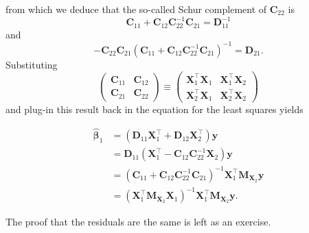 \documentclass[]{book}
\theoremstyle{definition}
\theoremstyle{definition}
\theoremstyle{definition}
\theoremstyle{remark}
\begin{document}
from which we deduce that the so-called Schur complement of
\(\mathbf{C}_{22}\) is
\[\mathbf{C}_{11}+\mathbf{C}_{12}\mathbf{C}^{-1}_{22}\mathbf{C}_{21} = \mathbf{D}_{11}^{-1}\]
and \[
-\mathbf{C}_{22}\mathbf{C}_{21}(\mathbf{C}_{11}+\mathbf{C}_{12}\mathbf{C}^{-1}_{22}\mathbf{C}_{21})^{-1} = \mathbf{D}_{21}.
\] Substituting \[
\begin{pmatrix} \mathbf{C}_{11} & \mathbf{C}_{12} \\ \mathbf{C}_{21} &\mathbf{C}_{22}
\end{pmatrix} \equiv \begin{pmatrix} \mathbf{X}_1^\top\mathbf{X}_1 & \mathbf{X}_1^\top\mathbf{X}_2\\\mathbf{X}_2^\top\mathbf{X}_1  &\mathbf{X}_2^\top\mathbf{X}_2 
\end{pmatrix}
\] and plug-in this result back in the equation for the least squares
yields

\begin{align*}
\hat{\boldsymbol{\beta}}_1 &= (\mathbf{D}_{11}\mathbf{X}_1^\top + \mathbf{D}_{12}\mathbf{X}_2^\top)\boldsymbol{y} 
\\&= \mathbf{D}_{11}( \mathbf{X}_1^\top - \mathbf{C}_{12}\mathbf{C}_{22}^{-1}\mathbf{X}_2)\boldsymbol{y}
\\&= \left(\mathbf{C}_{11}+\mathbf{C}_{12}\mathbf{C}^{-1}_{22}\mathbf{C}_{21}\right)^{-1} \mathbf{X}_1^\top\mathbf{M}_{\mathbf{X}_2}\boldsymbol{y} 
\\&= (\mathbf{X}_1^\top\mathbf{M}_{\mathbf{X}_2}\mathbf{X}_1)^{-1}\mathbf{X}_1^\top\mathbf{M}_{\mathbf{X}_2}\boldsymbol{y}.
\end{align*}

The proof that the residuals are the same is left as an exercise.


\end{document}
